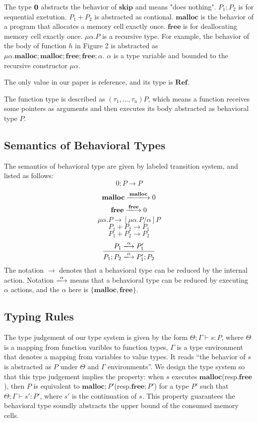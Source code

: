 \documentclass[english]{jssst_ppl} %
\newcommand\SKIP{\mathbf{skip}}
\newcommand\Malloc{\mathbf{malloc}}
\newcommand\Free{\mathbf{free}}
\begin{document}
The type $\bf 0$ abstracts the behavior of $\SKIP$ and means "does nothing". $P_{1};P_{2}$ is for sequential exetution. $P_{1} + P_{2}$ is abstracted as contional. $\Malloc$ is the behavior of a program that allocates a memory cell exactly once. $\Free$ is for deallocating memory cell exactly once. $\mu \alpha. P$ is a recursive type. For example, the behavior of  the body of function $h$ in Figure 2 is abstracted as $\mu \alpha. \Malloc;\Malloc;\Free;\Free;\alpha$. $\alpha$ is a type variable and bounded to the recursive constructor $\mu \alpha$.

The only value in our paper is reference, and its type is $\mathbf{Ref}$.

The function type is described as $(\tau_{1}, \dots, \tau_{n})P$, which means a function receives some pointers as arguments and then executes its body abstracted as behavioral type $P$.

\subsection{Semantics of Behavioral Types}
The semantics of behavioral type are given by labeled transition system, and listed as follows:
    $$
         0;P \rightarrow P
    $$
    $$
          \Malloc \xlongrightarrow{\Malloc} 0
    $$
    $$
           \Free \xlongrightarrow{\Free} 0
    $$
    $$
          \mu \alpha.P \rightarrow  [\mu \alpha . P/\alpha]  P
    $$
   $$
          P_{1} + P_{2} \longrightarrow P_{1}
   $$
   $$
          P_{1} + P_{2} \longrightarrow P_{2}
   $$
   $$
           \frac{P_{1} \xlongrightarrow{\alpha} P_{1}' }
                 {P_{1};P_{2} \xlongrightarrow{\alpha} P_{1}';P_{2}}
   $$
The notation $\rightarrow$ denotes that a behavioral type can be reduced by the internal action. Notation $\xlongrightarrow{\alpha}$ means that a behavioral type can be reduced by executing $\alpha$ actions, and the $\alpha$ here is $\{\Malloc, \Free\}$.

\subsection{Typing Rules}
The type judgement of our type system is given by the form $\Theta ; \Gamma \vdash s : P$, where $\Theta$ is a mapping from function varibles to function types, $\Gamma$ is a type environment that denotes a mapping from variables to value types.
It reads ``the behavior of $s$ is abstracted as $P$ under $\Theta$ and $\Gamma$ environments''. We design the type system so that this type judgement implies the property: when $s$ executes $\Malloc$(resp.$\Free$), then $P$ is equivalent to $\Malloc;P'$(resp.$\Free;P'$) for a type $P'$ such that $\Theta; \Gamma \vdash s': P'$, where $s'$ is the continuation of $s$. This property guarantees the behavioral type soundly abstracts the upper bound of the consumed memory cells.
\end{document}
